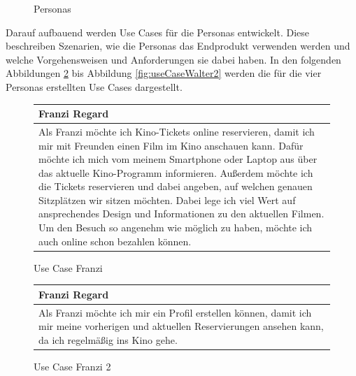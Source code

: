 \begin{figure}[H]
			\caption[Personas ]{\label{fig:personas}Personas}
		\end{figure} 
		
		Darauf aufbauend werden Use Cases für die Personas entwickelt. Diese beschreiben Szenarien, wie die Personas das Endprodukt verwenden werden und welche Vorgehensweisen und Anforderungen sie dabei haben. In den folgenden Abbildungen \ref{fig:useCaseFranzi} bis Abbildung \ref{fig:useCaseWalter2} werden die für die vier Personas erstellten Use Cases dargestellt.
		
		\begin{figure}[H]\begin{center}
			\begin{tabular}{p{}}
				\textbf{Franzi Regard} \\\toprule
				Als Franzi möchte ich Kino-Tickets online reservieren, damit ich mir mit Freunden einen Film im Kino anschauen kann. Dafür möchte ich mich vom meinem Smartphone oder Laptop aus über das aktuelle Kino-Programm informieren. Außerdem möchte ich die Tickets reservieren und dabei angeben, auf welchen genauen Sitzplätzen wir sitzen möchten. Dabei lege ich viel Wert auf ansprechendes Design und Informationen zu den aktuellen Filmen. Um den Besuch so angenehm wie möglich zu haben, möchte ich auch online schon bezahlen können.
			\end{tabular}
			\caption[Use Case Franzi]{\label{fig:useCaseFranzi} Use Case Franzi}
		\end{center}
		\end{figure}
	
		\begin{figure}[H] \begin{center}
			\begin{tabular}{p{}}
				\textbf{Franzi Regard} \\\toprule
				Als Franzi möchte ich mir ein Profil erstellen können, damit ich mir meine vorherigen und aktuellen Reservierungen ansehen kann, da ich regelmäßig ins Kino gehe. 
			\end{tabular}
			\caption[Use Case Franzi 2]{\label{fig:useCaseFranzi2} Use Case Franzi 2}
		\end{center}
		\end{figure}
	
